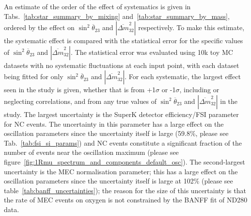An estimate of the order of the effect of systematics is given in Tabs.~\ref{tab:star_summary_by_mixing}
and~\ref{tab:star_summary_by_mass}, ordered by the effect on $\sin^{2}\overline{\theta}_{23}$ and $|\overline{\Delta m}^2_{32}|$ respectively.
To make this estimate, the systematic effect is compared with the statistical error for the
specific values of $\sin^{2}\overline{\theta}_{23}$ and $|\overline{\Delta m}^2_{32}|$.
The statistical error was evaluated using 10k toy MC datasets with no systematic fluctuations at each input point, 
with each dataset being fitted for only $\sin^{2}\overline{\theta}_{23}$ and $|\overline{\Delta m}^2_{32}|$.
For each systematic, the largest effect seen in the study is given, 
whether that is from +1$\sigma$ or -1$\sigma$, including or neglecting correlations,
and from any true values of $\sin^{2}\overline{\theta}_{23}$ and $|\overline{\Delta m}^2_{32}|$ in the study.
The largest uncertainty is the SuperK detector efficiency/FSI parameter for NC events. The uncertainty in this parameter has a large 
effect on the oscillation parameters since the uncertainty itself is large (59.8\%, please see Tab.~\ref{tab:fsi_si_params}) 
and NC events constitute a significant fraction of the number of events near the oscillation maximum (please see
figure~\ref{fig:1Rmu_spectrum_and_components_default_osc}). The second-largest uncertainty is the MEC normalisation parameter; this has a large 
effect on the oscillation parameters since the uncertainty itself is large at 102\% (please see table~\ref{tab:banff_uncertainties}); the reason 
for the size of this uncertainty is that the rate of MEC events on oxygen is not constrained by the BANFF fit of ND280 data.




